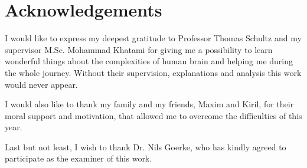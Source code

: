 \chapter{Acknowledgements}
\thispagestyle{empty}

\noindent%
I would like to express my deepest gratitude to Professor Thomas Schultz and my supervisor M.Sc. Mohammad Khatami for giving me a possibility to learn wonderful things about the complexities of human brain and helping me during the whole journey. Without their supervision, explanations and analysis this work would never appear.

I would also like to thank my family and my friends, Maxim and Kiril, for their moral support and motivation, that allowed me to overcome the difficulties of this year.

Last but not least, I wish to thank Dr. Nils Goerke, who has kindly agreed to participate as the examiner of this work.

\vfill